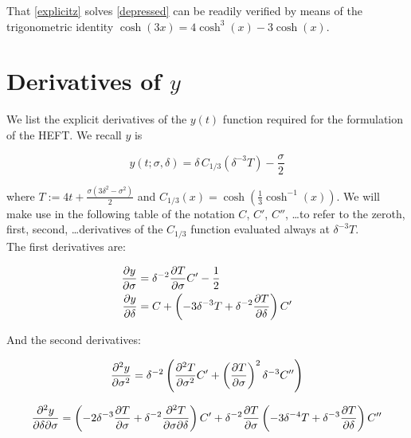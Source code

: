 That \eqref{explicitz} solves \eqref{depressed} can be readily verified by means of the trigonometric identity $\cosh(3x) = 4 \cosh^3(x) - 3 \cosh(x)$.



\section{Derivatives of $y$}\label{sec:yderivatives}

We list the explicit derivatives of the $y(t)$ function required for the formulation of the HEFT. We recall $y$ is

\begin{equation}
	y(t;\sigma,\delta) = \delta \, C_{1/3} \left( \delta^{-3} T \right) - \frac{\sigma}{2}
	\label{}
\end{equation}

where $T := 4t + \frac{\sigma(3\delta^2-\sigma^2)}{2}$ and $C_{1/3}(x) = \cosh\left( \frac{1}{3} \cosh^{-1}(x) \right)$. We will make use in the following table of the notation $C$, $C'$, $C''$, \dots to refer to the zeroth, first, second, \dots derivatives of the $C_{1/3}$ function evaluated always at $\delta^{-3} T$.\\

The first derivatives are:

\begin{align}
	\frac{\partial y}{\partial\sigma} & = \delta^{-2} \frac{\partial T}{\partial\sigma} C' - \frac{1}{2}\\
	\frac{\partial y}{\partial\delta} & = C + \left(-3 \delta^{-3} T + \delta^{-2} \frac{\partial T}{\partial\delta}\right) C'
\end{align}

And the second derivatives:

\begin{equation}
	\frac{\partial^2 y}{\partial \sigma^2} = \delta^{-2} \left( \frac{\partial^2 T}{\partial \sigma^2} C' + \left( \frac{\partial T}{\partial\sigma} \right)^2 \delta^{-3} C'' \right)
	\label{}
\end{equation}

\begin{equation}
	\frac{\partial^2 y}{\partial \delta \partial \sigma} = \left(-2\delta^{-3} \frac{\partial T}{\partial\sigma}  + \delta^{-2} \frac{\partial^2 T}{\partial \sigma \partial \delta} \right) C' + \delta^{-2} \frac{\partial T}{\partial\sigma} \left( -3\delta^{-4} T + \delta^{-3} \frac{\partial T}{\partial\delta} \right)C''
	\label{}
\end{equation}


